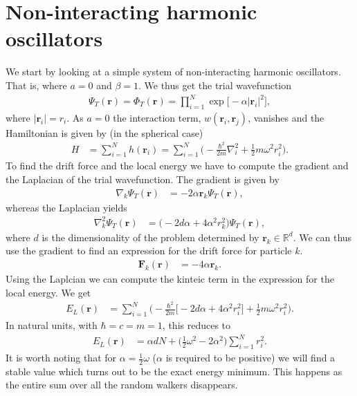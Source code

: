 \documentclass[
    a4paper, aps, twocolumn, floatfix, superscriptaddress, nofootinbib]{revtex4-1}
\newcommand{\vf}{\mathbf}
\newcommand{\1}{\mathds{1}}
\newcommand{\half}{\frac{1}{2}}
\begin{document}
\section{Non-interacting harmonic oscillators}
    We start by looking at a simple system of non-interacting harmonic
    oscillators. That is, where $a = 0$ and $\beta = 1$. We thus get the trial
    wavefunction
    \begin{align}
        \Psi_T(\vf{r})
        = \Phi_T(\vf{r})
        = \prod_{i = 1}^N \exp\bigl[
            -\alpha |\vf{r}_i|^2
        \bigr],
    \end{align}
    where $|\vf{r}_i| = r_i$. As $a = 0$ the interaction term,
    $w(\vf{r}_i, \vf{r}_j)$, vanishes and the Hamiltonian is given by
    (in the spherical case)
    \begin{align}
        H &= \sum_{i = 1}^N h(\vf{r}_i)
        = \sum_{i = 1}^N \Biggl(
            -\frac{\hbar^2}{2m}\nabla_i^2
            + \half m \omega^2 r_i^2
        \Biggr).
    \end{align}
    To find the drift force and the local energy we have to compute the gradient
    and the Laplacian of the trial wavefunction. The gradient is given by
    \begin{align}
        \nabla_k\Psi_T(\vf{r})
        &= -2\alpha \vf{r}_k\Psi_T(\vf{r}),
    \end{align}
    whereas the Laplacian yields
    \begin{align}
        \nabla^2_k\Psi_T(\vf{r})
        &= \big(-2d\alpha + 4\alpha^2 r_k^2\bigr)\Psi_T(\vf{r}),
    \end{align}
    where $d$ is the dimensionality of the problem determined by
    $\vf{r}_k \in \mathbb{R}^d$. We can thus use the gradient to find an
    expression for the drift force for particle $k$.
    \begin{align}
        \vf{F}_k(\vf{r})
        &= -4\alpha\vf{r}_k.
    \end{align}
    Using the Laplcian we can compute the kinteic term in the expression for the
    local energy. We get
    \begin{align}
        E_L(\vf{r})
        &=
        \sum_{i = 1}^N
        \Biggl(
            -\frac{\hbar^2}{2m}
            \bigl[
                -2d\alpha + 4\alpha^2 r_i^2
            \bigr]
            + \half m\omega^2 r_i^2
        \Biggr).
    \end{align}
    In natural units, with $\hbar = c = m = 1$, this reduces to
    \begin{align}
        E_L(\vf{r})
        &=
        \alpha dN
        + \biggl(
            \half\omega^2
            - 2\alpha^2
        \biggr)
        \sum_{i = 1}^N r_i^2.
        \label{eq:closed_form_natural_units_local_energy}
    \end{align}
    It is worth noting that for $\alpha = \half\omega$ ($\alpha$ is required to
    be positive) we will find a stable value which turns out to be the exact
    energy minimum. This happens as the entire sum over all the random walkers
    disappears.
\end{document}
